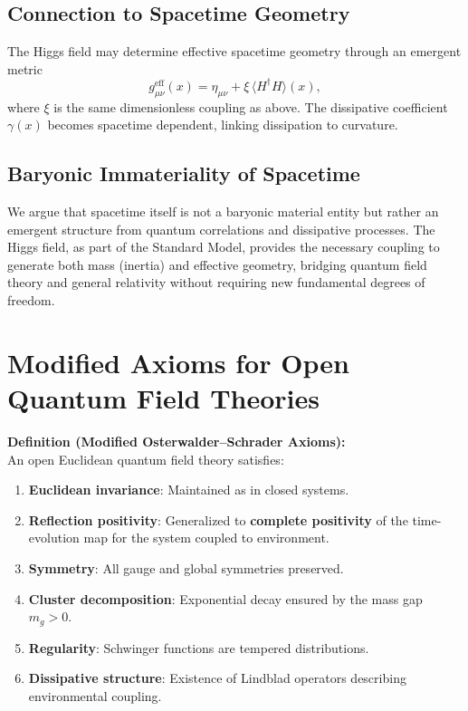 \documentclass[aps,prd,reprint,superscriptaddress,floatfix]{revtex4-2}
\begin{document}
\subsection{Connection to Spacetime Geometry}
The Higgs field may determine effective spacetime geometry through an emergent metric
\begin{equation}
g_{\mu\nu}^{\mathrm{eff}}(x) = \eta_{\mu\nu} + \xi\, \langle H^\dagger H \rangle (x),
\end{equation}
where $\xi$ is the same dimensionless coupling as above. The dissipative coefficient $\gamma(x)$ becomes spacetime dependent, linking dissipation to curvature.

\subsection{Baryonic Immateriality of Spacetime}
We argue that spacetime itself is not a baryonic material entity but rather an emergent structure from quantum correlations and dissipative processes. The Higgs field, as part of the Standard Model, provides the necessary coupling to generate both mass (inertia) and effective geometry, bridging quantum field theory and general relativity without requiring new fundamental degrees of freedom.

\section{Modified Axioms for Open Quantum Field Theories}
\label{sec:axioms}

\noindent\textbf{Definition (Modified Osterwalder--Schrader Axioms):}\\
An open Euclidean quantum field theory satisfies:
\begin{enumerate}
    \item \textbf{Euclidean invariance}: Maintained as in closed systems.
    \item \textbf{Reflection positivity}: Generalized to \textbf{complete positivity} of the time-evolution map for the system coupled to environment.
    \item \textbf{Symmetry}: All gauge and global symmetries preserved.
    \item \textbf{Cluster decomposition}: Exponential decay ensured by the mass gap $m_g > 0$.
    \item \textbf{Regularity}: Schwinger functions are tempered distributions.
    \item \textbf{Dissipative structure}: Existence of Lindblad operators describing environmental coupling.
\end{enumerate}
\end{document}
